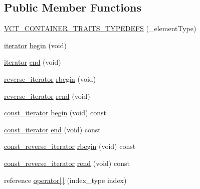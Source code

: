 \subsection*{Public Member Functions}
\begin{DoxyCompactItemize}
\item 
\hyperlink{classvct_dynamic_vector_base_a002c5a49abe5a7d4f4480c882b63739d}{V\+C\+T\+\_\+\+C\+O\+N\+T\+A\+I\+N\+E\+R\+\_\+\+T\+R\+A\+I\+T\+S\+\_\+\+T\+Y\+P\+E\+D\+E\+F\+S} (\+\_\+element\+Type)
\item 
\hyperlink{classvct_dynamic_const_vector_base_aaed13bc31a9ee4971bad765ba5c2c811}{iterator} \hyperlink{classvct_dynamic_vector_base_ab26ac6919f9cbbfa2df0bc60b4c37212}{begin} (void)
\item 
\hyperlink{classvct_dynamic_const_vector_base_aaed13bc31a9ee4971bad765ba5c2c811}{iterator} \hyperlink{classvct_dynamic_vector_base_a0db66404e972562ed8952947248c4be4}{end} (void)
\item 
\hyperlink{classvct_dynamic_const_vector_base_af10d167259519ceeca9276da3435e193}{reverse\+\_\+iterator} \hyperlink{classvct_dynamic_vector_base_a051fd4d8e7a0831cf8e20c3228a24b9f}{rbegin} (void)
\item 
\hyperlink{classvct_dynamic_const_vector_base_af10d167259519ceeca9276da3435e193}{reverse\+\_\+iterator} \hyperlink{classvct_dynamic_vector_base_ab2704e8e0ca57fb063515cf17424cbb5}{rend} (void)
\item 
\hyperlink{classvct_dynamic_const_vector_base_ad04d1e54698ac5e244d15dfacd0e603c}{const\+\_\+iterator} \hyperlink{classvct_dynamic_vector_base_ac76838f129302af0897b00aa7fc6e369}{begin} (void) const 
\item 
\hyperlink{classvct_dynamic_const_vector_base_ad04d1e54698ac5e244d15dfacd0e603c}{const\+\_\+iterator} \hyperlink{classvct_dynamic_vector_base_a98e165c1af677afb6dfc91d22cb7b422}{end} (void) const 
\item 
\hyperlink{classvct_dynamic_const_vector_base_aadfcc99550b376238b6c793c17d19ca5}{const\+\_\+reverse\+\_\+iterator} \hyperlink{classvct_dynamic_vector_base_a328e7ffa7b9da097998f9d279fc43c2f}{rbegin} (void) const 
\item 
\hyperlink{classvct_dynamic_const_vector_base_aadfcc99550b376238b6c793c17d19ca5}{const\+\_\+reverse\+\_\+iterator} \hyperlink{classvct_dynamic_vector_base_ab997e462e868b68f456fde3b6a110ac6}{rend} (void) const 
\item 
reference \hyperlink{classvct_dynamic_vector_base_a409f03ced63e5f2374ec9847754ab034}{operator\mbox{[}$\,$\mbox{]}} (index\+\_\+type index)

\end{DoxyCompactItemize}
